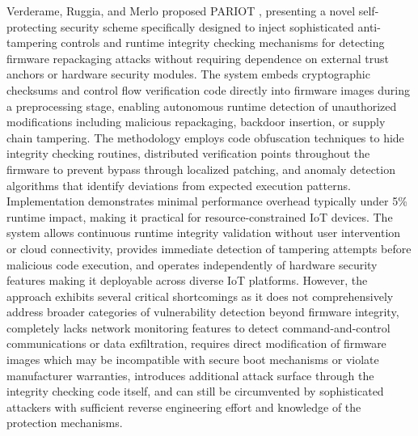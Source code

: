 Verderame, Ruggia, and Merlo proposed PARIOT \cite{verderame2023pariot}, presenting a novel self-protecting security scheme specifically designed to inject sophisticated anti-tampering controls and runtime integrity checking mechanisms for detecting firmware repackaging attacks without requiring dependence on external trust anchors or hardware security modules. The system embeds cryptographic checksums and control flow verification code directly into firmware images during a preprocessing stage, enabling autonomous runtime detection of unauthorized modifications including malicious repackaging, backdoor insertion, or supply chain tampering. The methodology employs code obfuscation techniques to hide integrity checking routines, distributed verification points throughout the firmware to prevent bypass through localized patching, and anomaly detection algorithms that identify deviations from expected execution patterns. Implementation demonstrates minimal performance overhead typically under 5\% runtime impact, making it practical for resource-constrained IoT devices. The system allows continuous runtime integrity validation without user intervention or cloud connectivity, provides immediate detection of tampering attempts before malicious code execution, and operates independently of hardware security features making it deployable across diverse IoT platforms. However, the approach exhibits several critical shortcomings as it does not comprehensively address broader categories of vulnerability detection beyond firmware integrity, completely lacks network monitoring features to detect command-and-control communications or data exfiltration, requires direct modification of firmware images which may be incompatible with secure boot mechanisms or violate manufacturer warranties, introduces additional attack surface through the integrity checking code itself, and can still be circumvented by sophisticated attackers with sufficient reverse engineering effort and knowledge of the protection mechanisms.

